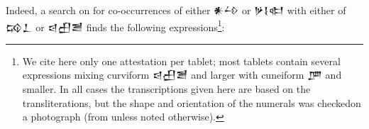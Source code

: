 \documentclass[10pt, a4paper, twoside]{article}
\begin{document}
Indeed, a search on \cite{EbDA} for co-occurrences of either {\xsuxfont 𒀭𒍡} or {\xsuxfont 𒃻𒋙𒊕} with
either of {\xsuxfont 𒄘𒁇} or {\xsuxfont 𒁀𒌷𒍪}
finds the following expressions\footnote{We cite here only one attestation per tablet;
most tablets contain several expressions mixing curviform {\xsuxfont 𒁀𒌷𒍪} and larger with cuneiform {\xsuxfont 𒂆} and smaller.
In all cases the transcriptions given here are based on the \cite{EbDA} transliterations, but the
shape and orientation of the numerals was checked\footnotemark on a photograph (from \cite{EbDA} unless noted otherwise).}:
\end{document}
